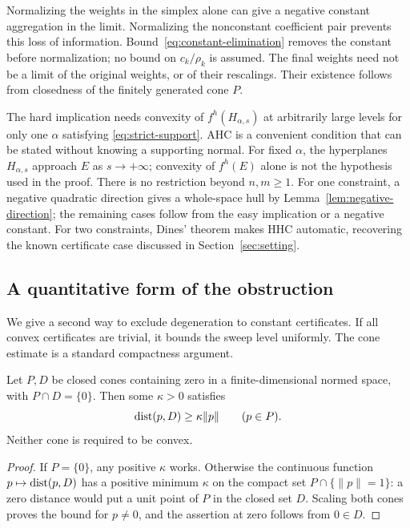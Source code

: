 \begin{remark}\label{rem:limit-scope}
Normalizing the weights in the simplex alone can give a negative constant
aggregation in the limit. Normalizing the nonconstant coefficient pair
prevents this loss of information. Bound~\eqref{eq:constant-elimination}
removes the constant before normalization; no bound on $c_k/\rho_k$ is
assumed. The final weights need not be a limit of the original weights,
or of their rescalings. Their existence follows from closedness of the
finitely generated cone $P$.
\end{remark}

\begin{remark}\label{rem:one-normal}
The hard implication needs convexity of $f^h(H_{\alpha,s})$ at
arbitrarily large levels for only one $\alpha$ satisfying
\eqref{eq:strict-support}. AHC is a convenient condition that can be
stated without knowing a supporting normal. For fixed $\alpha$, the
hyperplanes $H_{\alpha,s}$ approach $E$ as $s\to+\infty$;
convexity of $f^h(E)$ alone is not the hypothesis used in the proof.
There is no restriction beyond $n,m\geq1$. For one constraint,
a negative quadratic direction gives a whole-space hull by
Lemma~\ref{lem:negative-direction}; the remaining cases follow from
the easy implication or a negative constant. For two constraints,
Dines' theorem makes HHC automatic, recovering the known certificate
case discussed in Section~\ref{sec:setting}.
\end{remark}

\subsection{A quantitative form of the obstruction}
\label{sec:quantitative-obstruction}

We give a second way to exclude degeneration to constant certificates.
If all convex certificates are trivial, it bounds the sweep level
uniformly. The cone estimate is a standard compactness argument.

\begin{lemma}\label{lem:uniform-cones}
Let $P,D$ be closed cones containing zero in a finite-dimensional normed
space, with $P\cap D=\{0\}$. Then some $\kappa>0$ satisfies
\[
 \operatorname{dist}(p,D)\geq\kappa\|p\|\qquad(p\in P).
\]
Neither cone is required to be convex.
\end{lemma}
\begin{proof}
If $P=\{0\}$, any positive $\kappa$ works. Otherwise the continuous
function $p\mapsto\operatorname{dist}(p,D)$ has a positive minimum $\kappa$ on the
compact set $P\cap\{\|p\|=1\}$: a zero distance would put a unit
point of $P$ in the closed set $D$. Scaling both cones proves the bound
for $p\ne0$, and the assertion at zero follows from $0\in D$.
\end{proof}


